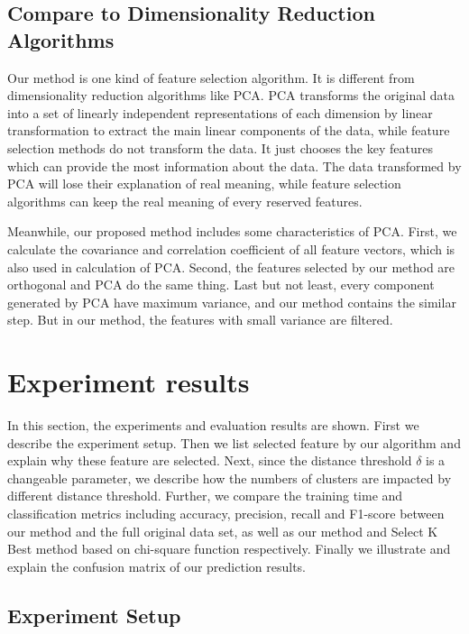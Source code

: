 \documentclass{ieeeaccess}
\theoremstyle{definition}
\begin{document}
\subsection{Compare to Dimensionality Reduction Algorithms}

Our method is one kind of feature selection algorithm. It is different from dimensionality reduction algorithms like PCA\cite{PCA1987}. PCA transforms the original data into a set of linearly independent representations of each dimension by linear transformation to extract the main linear components of the data, while feature selection methods do not transform the data. It just chooses the key features which can provide the most information about the data. The data transformed by PCA will lose their explanation of real meaning, while feature selection algorithms can keep the real meaning of every reserved features. 

Meanwhile, our proposed method includes some characteristics of PCA. First, we calculate the covariance and correlation coefficient of all feature vectors, which is also used in calculation of PCA. Second, the features selected by our method are orthogonal and PCA do the same thing. Last but not least, every component generated by PCA have maximum variance, and our method contains the similar step. But in our method, the features with small variance are filtered.

\section{Experiment results}
\label{sec:evaluation}

In this section, the experiments and evaluation results are shown. First we describe the experiment setup. Then we list selected feature by our algorithm and explain why these feature are selected. Next, since the distance threshold $\delta$ is a changeable parameter, we describe how the numbers of clusters are impacted by different distance threshold. Further, we compare the training time and classification metrics including accuracy, precision, recall and F1-score between our method and the full original data set, as well as our method and Select K Best method based on chi-square function respectively. Finally we illustrate and explain the confusion matrix of our prediction results.

\subsection{Experiment Setup}
\end{document}
